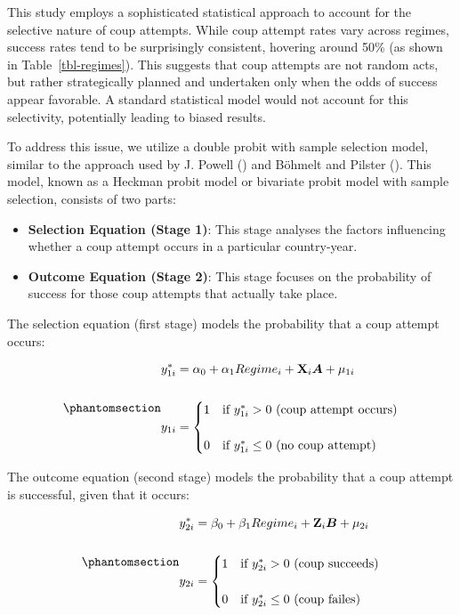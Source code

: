 \documentclass[
  12pt,
]{report}
\begin{document}
This study employs a sophisticated statistical approach to account for
the selective nature of coup attempts. While coup attempt rates vary
across regimes, success rates tend to be surprisingly consistent,
hovering around 50\% (as shown in Table~\ref{tbl-regimes}). This
suggests that coup attempts are not random acts, but rather
strategically planned and undertaken only when the odds of success
appear favorable. A standard statistical model would not account for
this selectivity, potentially leading to biased results.

To address this issue, we utilize a double probit with sample selection
model, similar to the approach used by J. Powell
() and Böhmelt and Pilster
(). This model, known as a Heckman
probit model or bivariate probit model with sample selection, consists
of two parts:

\begin{itemize}
\item
  \textbf{Selection Equation (Stage 1)}: This stage analyses the factors
  influencing whether a coup attempt occurs in a particular
  country-year.
\item
  \textbf{Outcome Equation (Stage 2)}: This stage focuses on the
  probability of success for those coup attempts that actually take
  place.
\end{itemize}

The selection equation (first stage) models the probability that a coup
attempt occurs:

\begin{equation}\phantomsection\label{eq-eq4}{
\begin{aligned}
y_{1i}^*&=\alpha_0 + \alpha_1 Regime_i + \mathbf{X}_i \boldsymbol{A} + \mu_{1i}
\\
\\
y_{1i} &= 
\begin{cases} 
1 &\text{if $y_{1i}^*>0$ (coup attempt occurs)} \\
\\
0 &\text{if $y_{1i}^*\le0$ (no coup attempt)}
\end{cases}
\end{aligned}
}\end{equation}

The outcome equation (second stage) models the probability that a coup
attempt is successful, given that it occurs:

\begin{equation}\phantomsection\label{eq-eq5}{
\begin{aligned}
y_{2i}^*&=\beta_0 + \beta_1 Regime_i + \mathbf{Z}_i \boldsymbol{B} + \mu_{2i}
\\
\\
y_{2i} &= 
\begin{cases} 
1 &\text{if $y_{2i}^*>0$ (coup succeeds)} \\
\\
0 &\text{if $y_{2i}^*\le0$ (coup failes)}
\end{cases}
\end{aligned}
}\end{equation}
\end{document}
